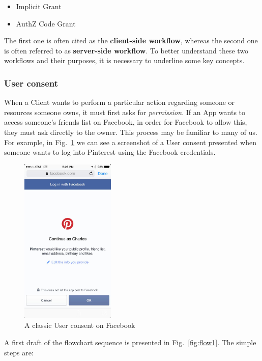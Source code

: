\documentclass[a4paper,12pt]{article}
\def\myfig#1{Fig.~#1\xspace}
\begin{document}
\begin{itemize}
    \item Implicit Grant
    \item AuthZ Code Grant
\end{itemize}

The first one is often cited as the \textbf{client-side workflow}, whereas the second one is often referred to as \textbf{server-side workflow}. To better understand these two workflows and their purposes, it is necessary to underline some key concepts.

\subsubsection{User consent}
When a Client wants to perform a particular action regarding someone or resources someone owns, it must first asks for \textit{permission}. If an App wants to access someone's friends list on Facebook, in order for Facebook to allow this, they must ask directly to the owner. This process may be familiar to many of us. For example, in \myfig{\ref{fig:usercon1}} we can see a screenshot of a User consent presented when someone wants to log into Pinterest using the Facebook credentials.

\vspace{0.5cm}
\begin{figure}[ht]
    \centering
    \includegraphics[width=0.4\textwidth]{figures/desktopaccess1.jpg}
    \caption{A classic User consent on Facebook}
    \label{fig:usercon1}
\end{figure}

A first draft of the flowchart sequence is presented in \myfig{\ref{fig:flow1}}. The simple steps are:
\end{document}

